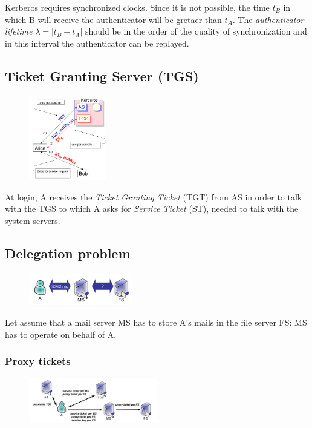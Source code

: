 \documentclass[a4paper,12pt]{article}
\begin{document}
Kerberos requires synchronized clocks. Since it is not possible, the time $t_B$ in which B will receive the authenticator will be gretaer than $t_A$.
The \textit{authenticator lifetime} $\lambda = |t_B - t_A|$ should be in the order of the quality of synchronization and in this interval the authenticator can be replayed.

\subsection{Ticket Granting Server (TGS)}
\begin{figure}[H]
  \centering
  \includegraphics[width=0.3\textwidth]{img/tgs}
\end{figure}

At login, A receives the \textit{Ticket Granting Ticket} (TGT) from AS in order to talk with the TGS to which A asks for \textit{Service Ticket} (ST), needed to talk with the system servers.

\subsection{Delegation problem}
\begin{figure}[H]
  \centering
  \includegraphics[width=0.4\textwidth]{img/delegation}
\end{figure}

Let assume that a mail server MS has to store A's mails in the file server FS: MS has to operate on behalf of A.

\subsubsection{Proxy tickets}

\begin{figure}[H]
  \centering
  \includegraphics[width=0.5\textwidth]{img/proxy}
\end{figure}
\end{document}
